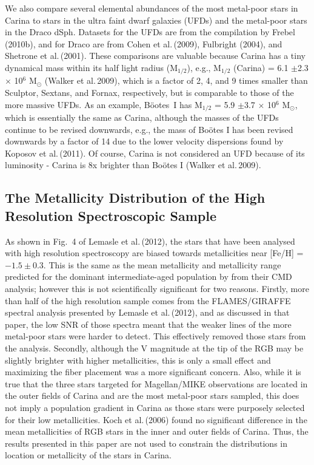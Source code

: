 \documentclass{emulateapj}
\newcommand\etal{{\rm et al.\,}}
\begin{document}
We also compare several elemental abundances of the most metal-poor stars
in Carina to stars in the ultra faint dwarf galaxies (UFDs) and the
metal-poor stars in the Draco dSph.   
Datasets for the UFDs are from the compilation by Frebel (2010b), and
for Draco are from Cohen \etal (2009), Fulbright (2004), and Shetrone \etal (2001).
These comparisons are valuable because Carina has a tiny dynamical mass within its 
half light radius (M$_{1/2}$), e.g.,  
M$_{1/2}$ (Carina) = 6.1 $\pm$2.3 $\times$ 10$^6$ M$_\odot$ 
(Walker \etal 2009),
which is a factor of 2, 4, and 9 times smaller than
Sculptor, Sextans, and Fornax, respectively, 
but is comparable to those of the more massive UFDs.
%
As an example, 
B\"ootes~I has M$_{1/2}$ = 5.9 $\pm$3.7 $\times$ 10$^6$ M$_\odot$,
which is essentially the same as Carina, 
although the masses of the UFDs continue to be revised downwards, 
e.g., the mass of Bo\"otes I has been revised downwards by a factor of 
14 due to the lower velocity dispersions found by Koposov \etal (2011).  
Of course, Carina is not considered an UFD because of its luminosity 
- Carina is 8x brighter than Bo\"otes I (Walker \etal 2009).   




\subsection {The Metallicity Distribution of the High Resolution Spectroscopic Sample}

As shown in Fig.~4 of Lemasle \etal (2012), the stars that have been
analysed with high resolution spectroscopy are biased towards metallicities 
near [Fe/H] = $-1.5 \pm0.3$.   This is the same as the mean metallicity 
and metallicity range predicted for the dominant intermediate-aged population 
by \citet{Bon10} from their CMD analysis; however this is not 
scientifically significant for two reasons.   
Firstly, more than half of the high resolution sample comes from the 
FLAMES/GIRAFFE spectral analysis presented by Lemasle \etal (2012), and as
discussed in that paper, the low SNR of those spectra meant that 
the weaker lines of the more metal-poor stars were harder to
detect.   This effectively removed those stars from the analysis.  
Secondly, although the V magnitude at the tip of the RGB may be slightly 
brighter with higher metallicities, this is only a small effect 
and maximizing the fiber placement was a more significant concern.  
% 
Also, while it is true that the three stars targeted for Magellan/MIKE observations
are located in the outer fields of Carina and are the most metal-poor stars
sampled, this does not imply a population gradient in Carina as those stars 
were purposely selected for their low metallicities.
Koch \etal (2006) found no significant difference in the mean metallicities
of RGB stars in the inner and outer fields of Carina.
%
Thus, the results presented in this paper are not used to constrain the 
distributions in location or metallicity of the stars in Carina.
\end{document}
